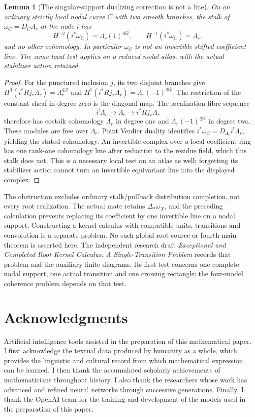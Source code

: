 \documentclass[11pt]{article}
\newtheorem{lemma}[proposition]{Lemma}
\theoremstyle{definition}
\theoremstyle{remark}
\begin{document}
\begin{lemma}[The singular-support dualizing correction is not a line]
\label{lem:root-nodal-dualizing-correction}
On an ordinary strictly local nodal curve $C$ with two smooth
branches, the stalk of $\omega_C=D_C\Lambda_r$ at the node $i$
has
\[
 H^{-2}(i^*\omega_C)=\Lambda_r(1)^{\oplus2},\qquad
 H^{-1}(i^*\omega_C)=\Lambda_r,
\]
and no other cohomology.  In particular $\omega_C$ is not an
invertible shifted coefficient line.  The same local test applies
on a reduced nodal atlas, with the actual stabilizer action retained.
\end{lemma}
\begin{proof}
For the punctured inclusion $j$, its two disjoint branches give
$H^0(i^*Rj_*\Lambda_r)=\Lambda_r^{\oplus2}$ and
$H^1(i^*Rj_*\Lambda_r)=\Lambda_r(-1)^{\oplus2}$.  The restriction
of the constant sheaf in degree zero is the diagonal map.
The localization fibre sequence
\[
 i^!\Lambda_r\longrightarrow\Lambda_r
                   \longrightarrow i^*Rj_*\Lambda_r
\]
therefore has costalk cohomology $\Lambda_r$ in degree one and
$\Lambda_r(-1)^{\oplus2}$ in degree two.  These modules are free
over $\Lambda_r$.  Point Verdier duality identifies
$i^*\omega_C=D_{\Lambda_r}i^!\Lambda_r$, yielding the stated
cohomology.  An invertible complex over a local coefficient ring
has one rank-one cohomology line after reduction to the residue
field, which this stalk does not.  This is a necessary local test
on an atlas as well; forgetting its stabilizer action cannot turn
an invertible equivariant line into the displayed complex.
\end{proof}

The obstruction excludes ordinary stalk/pullback distribution
completion, not every root realization.  The actual mate retains
$\Delta_*\omega_X$, and the preceding calculation prevents replacing
its coefficient by one invertible line on a nodal support.
Constructing a kernel calculus with compatible units, transitions
and convolution is a separate problem.  No such global root source
or fourth main theorem is asserted here.  The independent research
draft \emph{Exceptional and Completed Root Kernel Calculus: A
Single-Transition Problem} records that problem and the auxiliary
finite diagrams.  Its first test concerns one complete nodal support,
one actual transition and one crossing rectangle; the four-model
coherence problem depends on that test.

\section*{Acknowledgments}
Artificial-intelligence tools assisted in the preparation of this
mathematical paper. I first acknowledge the textual data produced by
humanity as a whole, which provides the linguistic and cultural record
from which mathematical expression can be learned. I then thank the
accumulated scholarly achievements of mathematicians throughout
history. I also thank the researchers whose work has advanced and
refined neural networks through successive generations. Finally, I
thank the OpenAI team for the training and development of the models
used in the preparation of this paper.
\end{document}
